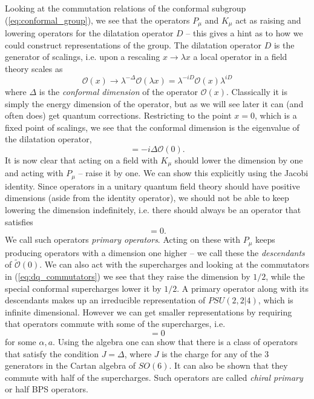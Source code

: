 Looking at the commutation relations of the conformal subgroup (\ref{eq:conformal_group}), we see that the operators $P_\mu$ and $K_\mu$ act as raising and lowering operators for the dilatation operator $D$ -- this gives a hint as to how we could construct representations of the group. The dilatation operator $D$ is the generator of scalings, i.e. upon a rescaling $x \rightarrow \lambda x$ a local operator in a field theory scales as 
\begin{equation}
	\mathcal{O}(x) \rightarrow \lambda^{-\Delta} \mathcal{O}(\lambda x) = \lambda^{-iD} \mathcal{O}(x) \lambda^{iD}
\end{equation}
where $\Delta$ is the \emph{conformal dimension} of the operator $\mathcal{O}(x)$. Classically it is simply the energy dimension of the operator, but as we will see later it can (and often does) get quantum corrections. Restricting to the point $x = 0$, which is a fixed point of scalings, we see that the conformal dimension is the eigenvalue of the dilatation operator,
\begin{equation}
	[D,\mathcal{O}(0)] = -i \Delta \mathcal{O}(0).
\end{equation}
It is now clear that acting on a field with $K_\mu$ should lower the dimension by one and acting with $P_\mu$ -- raise it by one. We can show this explicitly using the Jacobi identity. Since operators in a unitary quantum field theory should have positive dimensions (aside from the identity operator), we should not be able to keep lowering the dimension indefinitely, i.e. there should always be an operator that satisfies
\begin{equation}
	[K_\mu, \tilde{\mathcal{O}}(0)] = 0.
\end{equation} 
We call such operators \emph{primary operators}. Acting on these with $P_\mu$ keeps producing operators with a dimension one higher -- we call these the \emph{descendants} of $\tilde{\mathcal{O}}(0)$. We can also act with the supercharges and looking at the commutators in (\ref{eq:dq_commutators}) we see that they raise the dimension by $1/2$, while the special conformal supercharges lower it by $1/2$. A primary operator along with its descendants makes up an irreducible representation of $PSU(2,2|4)$, which is infinite dimensional. However we can get smaller representations by requiring that operators commute with some of the supercharges, i.e.
\begin{equation}
	[Q_{\alpha a}, \tilde{\mathcal{O}}(0)] = 0
\end{equation}
for some $\alpha, a$. Using the algebra one can show that there is a class of operators that satisfy the condition $J = \Delta$, where $J$ is the charge for any of the 3  generators in the Cartan algebra of $SO(6)$. It can also be shown that they commute with half of the supercharges. Such operators are called \emph{chiral primary} or half BPS operators.

